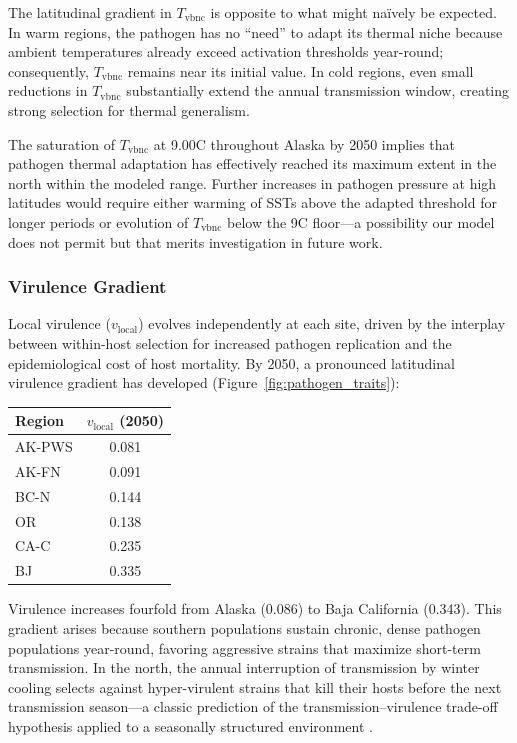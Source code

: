 \noindent
The latitudinal gradient in $T_\mathrm{vbnc}$ is opposite to what
might na\"ively be expected.  In warm regions, the pathogen has no
``need'' to adapt its thermal niche because ambient temperatures
already exceed activation thresholds year-round; consequently,
$T_\mathrm{vbnc}$ remains near its initial value.  In cold regions,
even small reductions in $T_\mathrm{vbnc}$ substantially extend the
annual transmission window, creating strong selection for thermal
generalism.

The saturation of $T_\mathrm{vbnc}$ at 9.00\textdegree C throughout
Alaska by 2050 implies that pathogen thermal adaptation has effectively
reached its maximum extent in the north within the modeled range.
Further increases in pathogen pressure at high latitudes would require
either warming of SSTs above the adapted threshold for longer periods
or evolution of $T_\mathrm{vbnc}$ below the 9\textdegree C floor---a
possibility our model does not permit but that merits investigation in
future work.

\subsubsection{Virulence Gradient}

Local virulence ($v_\mathrm{local}$) evolves independently at each
site, driven by the interplay between within-host selection for
increased pathogen replication and the epidemiological cost of host
mortality.  By 2050, a pronounced latitudinal virulence gradient has
developed (Figure~\ref{fig:pathogen_traits}):

\begin{center}
\begin{tabular}{lc}
\toprule
\textbf{Region} & $v_\mathrm{local}$ (2050) \\
\midrule
AK-PWS & 0.081 \\
AK-FN  & 0.091 \\
BC-N   & 0.144 \\
OR     & 0.138 \\
CA-C   & 0.235 \\
BJ     & 0.335 \\
\bottomrule
\end{tabular}
\end{center}

\noindent
Virulence increases fourfold from Alaska (0.086) to Baja California
(0.343).  This gradient arises because southern populations sustain
chronic, dense pathogen populations year-round, favoring
aggressive strains that maximize short-term transmission.  In the
north, the annual interruption of transmission by winter cooling
selects against hyper-virulent strains that kill their hosts before the
next transmission season---a classic prediction of the
transmission--virulence trade-off hypothesis applied to a seasonally
structured environment \citep{alizon2009}.

